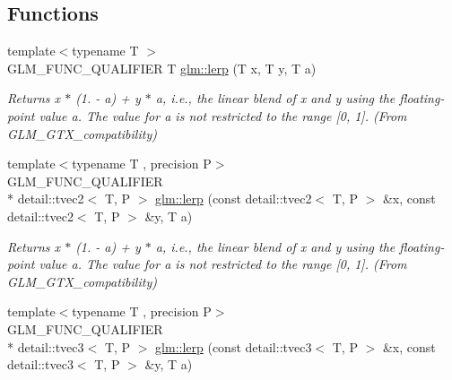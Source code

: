 \subsection*{Functions}
\begin{DoxyCompactItemize}
\item 
\hypertarget{group__gtx__compatibility_ga5494ba3a95ea6594c86fc75236886864}{{\footnotesize template$<$typename T $>$ }\\G\-L\-M\-\_\-\-F\-U\-N\-C\-\_\-\-Q\-U\-A\-L\-I\-F\-I\-E\-R T \hyperlink{group__gtx__compatibility_ga5494ba3a95ea6594c86fc75236886864}{glm\-::lerp} (T x, T y, T a)}\label{group__gtx__compatibility_ga5494ba3a95ea6594c86fc75236886864}

\begin{DoxyCompactList}\small\item\em Returns x $\ast$ (1. -\/ a) + y $\ast$ a, i.\-e., the linear blend of x and y using the floating-\/point value a. The value for a is not restricted to the range \mbox{[}0, 1\mbox{]}. (From G\-L\-M\-\_\-\-G\-T\-X\-\_\-compatibility) \end{DoxyCompactList}\item 
\hypertarget{group__gtx__compatibility_gad97d71f29fcd1d51a1857a74b67490a0}{{\footnotesize template$<$typename T , precision P$>$ }\\G\-L\-M\-\_\-\-F\-U\-N\-C\-\_\-\-Q\-U\-A\-L\-I\-F\-I\-E\-R \\*
detail\-::tvec2$<$ T, P $>$ \hyperlink{group__gtx__compatibility_gad97d71f29fcd1d51a1857a74b67490a0}{glm\-::lerp} (const detail\-::tvec2$<$ T, P $>$ \&x, const detail\-::tvec2$<$ T, P $>$ \&y, T a)}\label{group__gtx__compatibility_gad97d71f29fcd1d51a1857a74b67490a0}

\begin{DoxyCompactList}\small\item\em Returns x $\ast$ (1. -\/ a) + y $\ast$ a, i.\-e., the linear blend of x and y using the floating-\/point value a. The value for a is not restricted to the range \mbox{[}0, 1\mbox{]}. (From G\-L\-M\-\_\-\-G\-T\-X\-\_\-compatibility) \end{DoxyCompactList}\item 
\hypertarget{group__gtx__compatibility_ga5680b8166d1d6a5fa70cbfb56345a5e6}{{\footnotesize template$<$typename T , precision P$>$ }\\G\-L\-M\-\_\-\-F\-U\-N\-C\-\_\-\-Q\-U\-A\-L\-I\-F\-I\-E\-R \\*
detail\-::tvec3$<$ T, P $>$ \hyperlink{group__gtx__compatibility_ga5680b8166d1d6a5fa70cbfb56345a5e6}{glm\-::lerp} (const detail\-::tvec3$<$ T, P $>$ \&x, const detail\-::tvec3$<$ T, P $>$ \&y, T a)}\label{group__gtx__compatibility_ga5680b8166d1d6a5fa70cbfb56345a5e6}


\end{DoxyCompactItemize}
